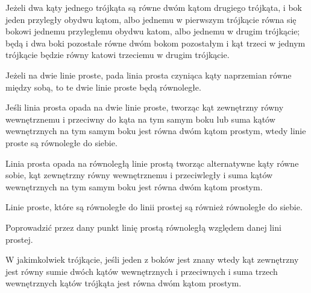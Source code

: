 \begin{euclid_theorem}
    Jeżeli dwa kąty jednego trójkąta są równe dwóm kątom drugiego trójkąta, i bok jeden przyległy obydwu kątom, albo jednemu w pierwszym trójkącie równa się bokowi jednemu przyległemu obydwu katom, albo jednemu w drugim trójkącie; będą i dwa boki pozostałe równe dwóm bokom pozostałym i kąt trzeci w jednym trójkącie będzie równy katowi trzeciemu w drugim trójkącie.
\end{euclid_theorem}

\begin{euclid_theorem}
    Jeżeli na dwie linie proste, pada linia prosta czyniąca kąty naprzemian równe między sobą, to te dwie linie proste będą równoległe.
\end{euclid_theorem}

\begin{euclid_theorem}
    Jeśli linia prosta opada na dwie linie proste, tworząc kąt zewnętrzny równy wewnętrznemu i przeciwny do kąta na tym samym boku lub suma kątów wewnętrznych na tym samym boku jest równa dwóm kątom prostym, wtedy linie proste są równoległe do siebie.
\end{euclid_theorem}

\begin{euclid_theorem}
    Linia prosta opada na równoległą linie prostą tworząc alternatywne kąty równe sobie, kąt zewnętrzny równy wewnętrznemu i przeciwległy i suma kątów wewnętrznych na tym samym boku jest równa dwóm kątom prostym.
\end{euclid_theorem}

\begin{euclid_theorem}
    Linie proste, które są równoległe do linii prostej są również równoległe do siebie.
\end{euclid_theorem}

\begin{euclid_theorem}
    Poprowadzić przez dany punkt linię prostą równoległą względem danej lini prostej.
\end{euclid_theorem}

\begin{euclid_theorem}
    W jakimkolwiek trójkącie, jeśli jeden z boków jest znany wtedy kąt zewnętrzny jest równy sumie dwóch kątów wewnętrznych i przeciwnych i suma trzech wewnętrznych kątów trójkąta jest równa dwóm kątom prostym.
\end{euclid_theorem}

